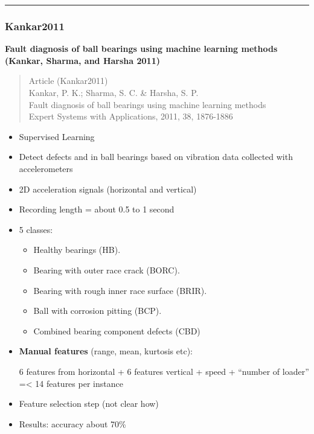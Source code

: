 \documentclass[
  letterpaper,
  DIV=11,
  numbers=noendperiod]{scrartcl}
\providecommand{\tightlist}{%
  \setlength{\itemsep}{0pt}\setlength{\parskip}{0pt}}\usepackage{longtable,booktabs,array}
\begin{document}
\begin{center}\rule{0.5\linewidth}{0.5pt}\end{center}

\hypertarget{kankar2011}{%
\subsubsection{Kankar2011}\label{kankar2011}}

\textbf{Fault diagnosis of ball bearings using machine learning methods
(Kankar, Sharma, and Harsha 2011)}

\begin{quote}
Article (Kankar2011)\\
Kankar, P. K.; Sharma, S. C. \& Harsha, S. P.\\
Fault diagnosis of ball bearings using machine learning methods\\
Expert Systems with Applications, 2011, 38, 1876-1886
\end{quote}

\begin{itemize}
\item
  Supervised Learning
\item
  Detect defects and in ball bearings based on vibration data collected
  with accelerometers
\item
  2D acceleration signals (horizontal and vertical)
\item
  Recording length = about 0.5 to 1 second
\item
  5 classes:

  \begin{itemize}
  \tightlist
  \item
    Healthy bearings (HB).
  \item
    Bearing with outer race crack (BORC).
  \item
    Bearing with rough inner race surface (BRIR).
  \item
    Ball with corrosion pitting (BCP).
  \item
    Combined bearing component defects (CBD)
  \end{itemize}
\item
  \textbf{Manual features} (range, mean, kurtosis etc):

  6 features from horizontal + 6 features vertical + speed + ``number of
  loader'' =\textless{} 14 features per instance
\item
  Feature selection step (not clear how)
\item
  Results: accuracy about 70\%
\end{itemize}
\end{document}
